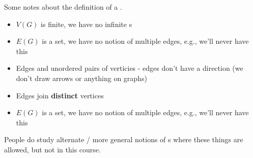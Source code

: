 \documentclass[english, 11pt]{article}
\begin{document}
Some notes about the definition of a .
\begin{itemize}
  \item $V(G)$ is finite, we have no infinite s
  \item $E(G)$ is a set, we have no notion of multiple edges, e.g., we'll never have this
    \begin{center}
\end{center}
\item Edges and unordered pairs of verticies - edges don't have a direction (we don't draw arrows or anything on graphs)
\item Edges join \textbf{distinct} vertices
  \item $E(G)$ is a set, we have no notion of multiple edges, e.g., we'll never have this
    \begin{center}
\end{center}
\end{itemize}
People do study alternate / more general notions of s where these things are allowed, but not in this course.
\end{document}
